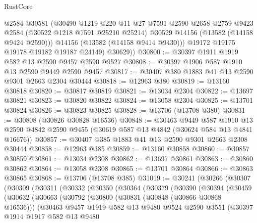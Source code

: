 \begin{lexlean}{RustCore}
\begin{coremodule}
            @2584
            @30581
            (@30490
              @1219
              @220
              @11
              @27
              @7591
              @2590
              @2658
              @2759
              @9423
              @2584
              (@30522 @1218 @7591 @25210 @25214)
              @30529
              @14156
              (@13582 (@14158 @9424 @2590)))
            @14156
            (@13582 (@14158 @9414 @9430)))
          @19172
          @19175
          @19178
          @19182
          @19187
          @24149)
        @30629))
@30800 := @30397 @1911 @1919 @582 @13 @2590 @9457 @2590 @9527
@30808 := @30397 @1906 @587 @1910 @13 @2590 @9449 @2590 @9457
@30817 := @30407 @380 @1883 @41 @13 @2590 @9301 @2663 @2304 @30444
@30818 := @12963 @380
@30819 := @13160 @30818
@30820 := @30817 @30819
@30821 := @13034 @2304
@30822 := @13697 @30821
@30823 := @30820 @30822
@30824 := @13058 @2304
@30825 := @13701 @30824
@30826 := @30823 @30825
@30828 := @13706 (@13708 @380)
@30831 := @30808 (@30826 @30828 @16536)
@30848 := @30463
    @9449
    @587
    @1910
    @13
    @2590
    @4842
    @2590
    @9455
    (@30619 @587 @13 @4842 (@30624 @584 @13 @4841 @16676))
@30857 := @30407 @385 @1883 @41 @13 @2590 @9301 @2663 @2308 @30444
@30858 := @12963 @385
@30859 := @13160 @30858
@30860 := @30857 @30859
@30861 := @13034 @2308
@30862 := @13697 @30861
@30863 := @30860 @30862
@30864 := @13058 @2308
@30865 := @13701 @30864
@30866 := @30863 @30865
@30868 := @13706 (@13708 @385)
@31019 := @30241
    (@30266
      (@30307
        (@30309
          (@30311
            (@30332
              (@30350
                (@30364
                  (@30379
                    (@30390
                      (@30394
                        (@30459
                          (@30632
                            (@30663
                              (@30792
                                (@30800
                                  (@30831 (@30848 (@30866 @30868 @16536)))
                                  (@30463
                                    @9457
                                    @1919
                                    @582
                                    @13
                                    @9480
                                    @9524
                                    @2590
                                    @3551
                                    (@30397
                                      @1914
                                      @1917
                                      @582
                                      @13
                                      @9480

\end{coremodule}
\end{lexlean}
